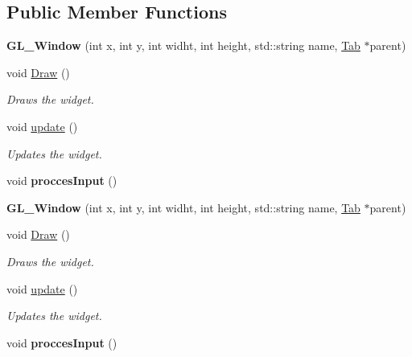 \subsection*{Public Member Functions}
\begin{DoxyCompactItemize}
\item 
\mbox{\label{class_g_l___window_a5ee39d8653f8d1d93ace7c6e4590cd08}} 
{\bfseries G\+L\+\_\+\+Window} (int x, int y, int widht, int height, std\+::string name, \hyperlink{class_tab}{Tab} $\ast$parent)
\item 
void \hyperlink{class_g_l___window_a0065950273a11cddec75d1a4d2cf723e}{Draw} ()
\begin{DoxyCompactList}\small\item\em Draws the widget. \end{DoxyCompactList}\item 
void \hyperlink{class_g_l___window_a34eab971f586b7d383d05475195bc462}{update} ()
\begin{DoxyCompactList}\small\item\em Updates the widget. \end{DoxyCompactList}\item 
\mbox{\label{class_g_l___window_aa63475ea1ee96011d5507ad1cca1ea20}} 
void {\bfseries procces\+Input} ()
\item 
\mbox{\label{class_g_l___window_a5ee39d8653f8d1d93ace7c6e4590cd08}} 
{\bfseries G\+L\+\_\+\+Window} (int x, int y, int widht, int height, std\+::string name, \hyperlink{class_tab}{Tab} $\ast$parent)
\item 
void \hyperlink{class_g_l___window_a0065950273a11cddec75d1a4d2cf723e}{Draw} ()
\begin{DoxyCompactList}\small\item\em Draws the widget. \end{DoxyCompactList}\item 
void \hyperlink{class_g_l___window_a34eab971f586b7d383d05475195bc462}{update} ()
\begin{DoxyCompactList}\small\item\em Updates the widget. \end{DoxyCompactList}\item 
\mbox{\label{class_g_l___window_aa63475ea1ee96011d5507ad1cca1ea20}} 
void {\bfseries procces\+Input} ()
\end{DoxyCompactItemize}
